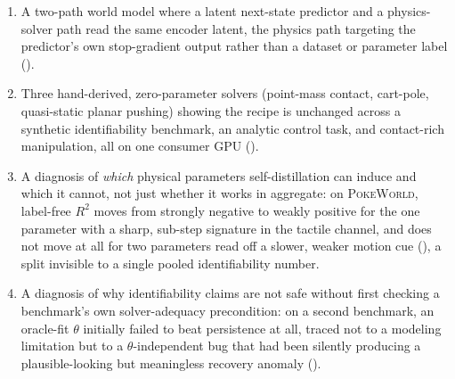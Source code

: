 \begin{enumerate}[leftmargin=1.6em, itemsep=2pt]
  \item A two-path world model where a latent next-state predictor and
    a physics-solver path read the same encoder latent, the physics
    path targeting the predictor's own stop-gradient output rather than
    a dataset or parameter label ().
  \item Three hand-derived, zero-parameter solvers (point-mass contact,
    cart-pole, quasi-static planar pushing) showing the recipe is
    unchanged across a synthetic identifiability benchmark, an analytic
    control task, and contact-rich manipulation, all on one consumer
    GPU ().
  \item A diagnosis of \emph{which} physical parameters self-distillation
    can induce and which it cannot, not just whether it works in
    aggregate: on \textsc{PokeWorld}, label-free $R^2$ moves from
    strongly negative to weakly positive for the one parameter with a
    sharp, sub-step signature in the tactile channel, and does not move
    at all for two parameters read off a slower, weaker motion cue
    (), a split invisible to a single pooled
    identifiability number.
  \item A diagnosis of why identifiability claims are not safe without
    first checking a benchmark's own solver-adequacy precondition: on a
    second benchmark, an oracle-fit $\theta$ initially failed to beat
    persistence at all, traced not to a modeling limitation but to a
    $\theta$-independent bug that had been silently producing a
    plausible-looking but meaningless recovery anomaly
    ().
\end{enumerate}
